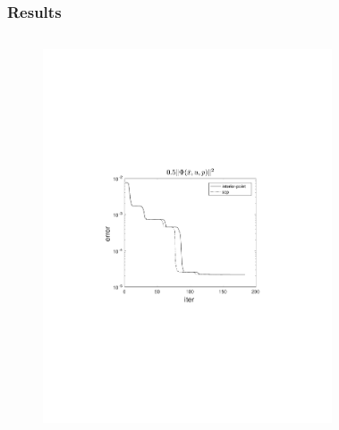 \begin{frame}
    \frametitle{Results}
    \begin{columns}[t]
            \begin{figure}
                \centering
                \includegraphics[trim=4cm 9cm 4cm 8.5cm, clip=true, width=\linewidth]{img/convPlotPhi_1}
            \end{figure}
            \begin{figure}
                \centering

\end{figure}
\end{columns}
\end{frame}
